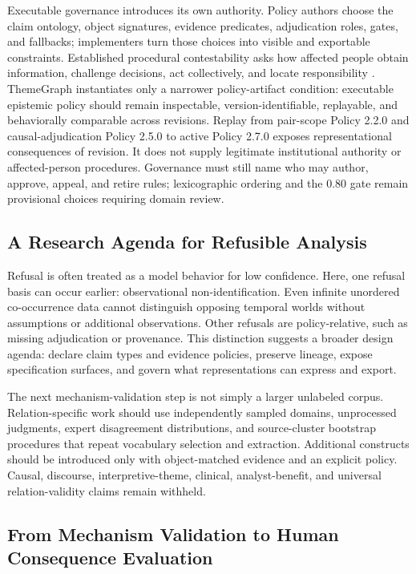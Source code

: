 \documentclass[manuscript,screen,review,anonymous]{acmart}
\begin{document}
Executable governance introduces its own authority. Policy authors choose the claim ontology, object signatures, evidence predicates, adjudication roles, gates, and fallbacks; implementers turn those choices into visible and exportable constraints. Established procedural contestability asks how affected people obtain information, challenge decisions, act collectively, and locate responsibility \cite{yurrita2025}. ThemeGraph instantiates only a narrower policy-artifact condition: executable epistemic policy should remain inspectable, version-identifiable, replayable, and behaviorally comparable across revisions. Replay from pair-scope Policy 2.2.0 and causal-adjudication Policy 2.5.0 to active Policy 2.7.0 exposes representational consequences of revision. It does not supply legitimate institutional authority or affected-person procedures. Governance must still name who may author, approve, appeal, and retire rules; lexicographic ordering and the 0.80 gate remain provisional choices requiring domain review.

\subsection{A Research Agenda for Refusible Analysis}

Refusal is often treated as a model behavior for low confidence. Here, one refusal basis can occur earlier: observational non-identification. Even infinite unordered co-occurrence data cannot distinguish opposing temporal worlds without assumptions or additional observations. Other refusals are policy-relative, such as missing adjudication or provenance. This distinction suggests a broader design agenda: declare claim types and evidence policies, preserve lineage, expose specification surfaces, and govern what representations can express and export.

The next mechanism-validation step is not simply a larger unlabeled corpus. Relation-specific work should use independently sampled domains, unprocessed judgments, expert disagreement distributions, and source-cluster bootstrap procedures that repeat vocabulary selection and extraction. Additional constructs should be introduced only with object-matched evidence and an explicit policy. Causal, discourse, interpretive-theme, clinical, analyst-benefit, and universal relation-validity claims remain withheld.

\subsection{From Mechanism Validation to Human Consequence Evaluation}
\end{document}

